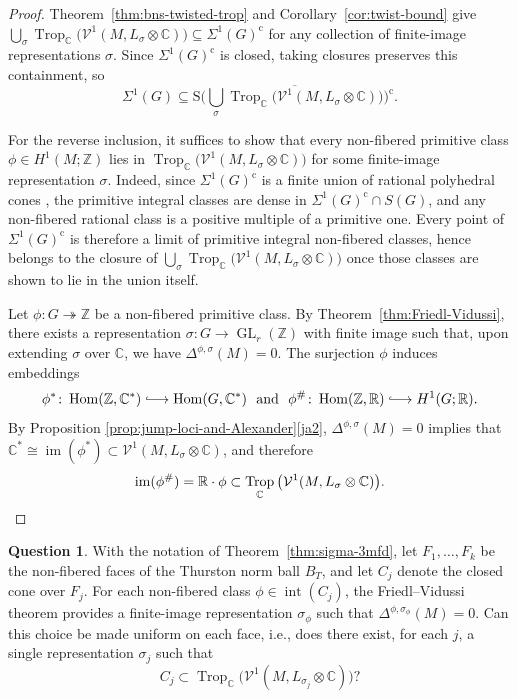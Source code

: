 \documentclass[11pt]{amsart}
\theoremstyle{definition}
\newtheorem{question}[theorem]{Question}
\newcommand{\Z}{\mathbb{Z}}
\newcommand{\R}{\mathbb{R}}
\newcommand{\C}{\mathbb{C}}
\newcommand{\VV}{\mathcal{V}}
\newcommand{\rS}{\mathrm{S}}
\DeclareMathOperator{\im}{im}
\DeclareMathOperator{\GL}{GL}
\DeclareMathOperator{\Hom}{{Hom}}
\DeclareMathOperator{\Trop}{Trop}
\newcommand{\surj}{\twoheadrightarrow}
\newcommand{\longinj}{\lhook\joinrel\longrightarrow}
\newcommand{\compl}{\mathrm{c}}
\begin{document}
\begin{proof}
Theorem~\ref{thm:bns-twisted-trop} and Corollary~\ref{cor:twist-bound}
give $\bigcup_{\sigma}\Trop_\C\big(\VV^1(M,L_{\sigma}\otimes \C)\big)
\subseteq \Sigma^1(G)^{\compl}$ for any collection of finite-image
representations $\sigma$.  Since $\Sigma^1(G)^{\compl}$ is closed,
taking closures preserves this containment, so
\[
\Sigma^1(G) \subseteq \rS\Bigg(\overline{\bigcup_{\sigma}
\Trop_\C\big(\VV^1(M,L_{\sigma}\otimes \C)\big)}\Bigg)^{\compl}.
\]

For the reverse inclusion, it suffices to show that every non-fibered 
primitive class $\phi \in H^1(M;\Z)$ lies in 
$\Trop_\C\big(\VV^1(M,L_{\sigma}\otimes\C)\big)$ for some 
finite-image representation $\sigma$.  Indeed, since $\Sigma^1(G)^{\compl}$
is a finite union of rational polyhedral cones \cite[Thm.~E]{BNS}, 
the primitive integral classes are dense in 
$\Sigma^1(G)^{\compl}\cap S(G)$, and any non-fibered rational class is a 
positive multiple of a primitive one.  Every point of $\Sigma^1(G)^{\compl}$
is therefore a limit of primitive integral non-fibered classes, 
hence belongs to the closure of 
$\bigcup_\sigma\Trop_\C\big(\VV^1(M,L_\sigma\otimes\C)\big)$
once those classes are shown to lie in the union itself.

Let $\phi\colon G\surj \Z$ be a non-fibered primitive class.
By Theorem~\ref{thm:Friedl-Vidussi}, there exists a representation 
$\sigma\colon G\to \GL_r(\Z)$ with finite image such that, upon 
extending $\sigma$ over $\C$, we have $\Delta^{\phi,\sigma}(M)=0$. 
The surjection $\phi$ induces embeddings 
\[
\phi^*\colon \Hom(\Z,\C^*) \longinj \Hom(G,\C^*)
\ \text{ and } \
\phi^\# \colon \Hom(\Z,\R) \longinj H^1(G;\R).
\]
By  Proposition \ref{prop:jump-loci-and-Alexander}\eqref{ja2}, 
$\Delta^{\phi,\sigma}(M)=0$ implies that 
$\C^*\cong \im(\phi^*) \subset \VV^1(M,L_\sigma\otimes \C)$, and therefore 
\[
\im(\phi^\#) = \R\cdot \phi \subset 
\Trop_\C\big(\VV^1(M,L_\sigma\otimes \C)\big). \qedhere
\]
\end{proof}

\begin{question}
\label{quest:face}
With the notation of Theorem~\ref{thm:sigma-3mfd}, let 
$F_1,\ldots,F_k$ be the non-fibered faces of the Thurston norm ball $B_T$, 
and let $C_j$ denote the closed cone over $F_j$.
For each non-fibered class $\phi \in \operatorname{int}(C_j)$, the 
Friedl--Vidussi theorem provides a finite-image representation 
$\sigma_\phi$ such that $\Delta^{\phi,\sigma_\phi}(M)=0$.
Can this choice be made uniform on each face, i.e., does there exist,
for each $j$, a single representation $\sigma_j$ such that
\[
C_j \subset \Trop_\C\big(\VV^1(M,L_{\sigma_j}\otimes \C)\big)?
\]
\end{question}
\end{document}
